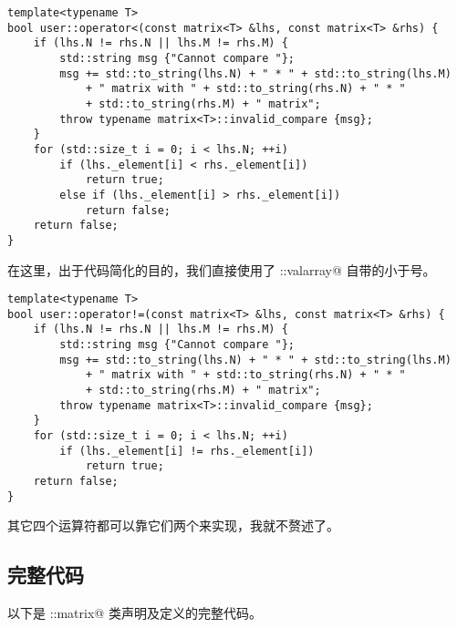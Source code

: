 \begin{lstlisting}
template<typename T>
bool user::operator<(const matrix<T> &lhs, const matrix<T> &rhs) {
    if (lhs.N != rhs.N || lhs.M != rhs.M) {
        std::string msg {"Cannot compare "};
        msg += std::to_string(lhs.N) + " * " + std::to_string(lhs.M)
            + " matrix with " + std::to_string(rhs.N) + " * "
            + std::to_string(rhs.M) + " matrix";
        throw typename matrix<T>::invalid_compare {msg};
    }
    for (std::size_t i = 0; i < lhs.N; ++i)
        if (lhs._element[i] < rhs._element[i])
            return true;
        else if (lhs._element[i] > rhs._element[i])
            return false;
    return false;
}
\end{lstlisting}
在这里，出于代码简化的目的，我们直接使用了 \lstinline@std::valarray@ 自带的小于号。
\begin{lstlisting}
template<typename T>
bool user::operator!=(const matrix<T> &lhs, const matrix<T> &rhs) {
    if (lhs.N != rhs.N || lhs.M != rhs.M) {
        std::string msg {"Cannot compare "};
        msg += std::to_string(lhs.N) + " * " + std::to_string(lhs.M)
            + " matrix with " + std::to_string(rhs.N) + " * "
            + std::to_string(rhs.M) + " matrix";
        throw typename matrix<T>::invalid_compare {msg};
    }
    for (std::size_t i = 0; i < lhs.N; ++i)
        if (lhs._element[i] != rhs._element[i])
            return true;
    return false;
}
\end{lstlisting}
其它四个运算符都可以靠它们两个来实现，我就不赘述了。\par
\subsection*{完整代码}
以下是 \lstinline@user::matrix@ 类声明及定义的完整代码。


